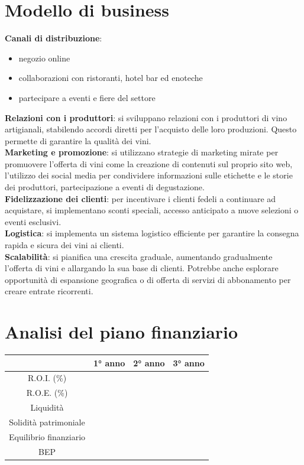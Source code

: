 \documentclass[12pt, a4paper]{article}
\newcommand{\meskip}{\medskip \\}
\begin{document}
\section*{Modello di business}
\textbf{Canali di distribuzione}:
\begin{itemize}[itemsep=-5pt, topsep=0pt]
    \item negozio online
    \item collaborazioni con ristoranti, hotel bar ed enoteche
    \item partecipare a eventi e fiere del settore
\end{itemize}\medskip
\textbf{Relazioni con i produttori}: si sviluppano relazioni con i produttori di vino artigianali, stabilendo accordi diretti per l'acquisto delle loro produzioni. Questo permette di garantire la qualità dei vini.\meskip
\textbf{Marketing e promozione}: si utilizzano strategie di marketing mirate per promuovere l'offerta di vini come la creazione di contenuti sul proprio sito web, l'utilizzo dei social media per condividere informazioni sulle etichette e le storie dei produttori, partecipazione a eventi di degustazione.\meskip
\textbf{Fidelizzazione dei clienti}: per incentivare i clienti fedeli a continuare ad acquistare, si implementano sconti speciali, accesso anticipato a nuove selezioni o eventi esclusivi.\meskip
\textbf{Logistica}: si implementa un sistema logistico efficiente per garantire la consegna rapida e sicura dei vini ai clienti.\meskip
\textbf{Scalabilità}: si pianifica una crescita graduale, aumentando gradualmente l'offerta di vini e allargando la sua base di clienti. Potrebbe anche esplorare opportunità di espansione geografica o di offerta di servizi di abbonamento per creare entrate ricorrenti.
\newpage
\section*{Analisi del piano finanziario}
\begin{tabular}{|c|c|c|c|}
    \hline
                           & 1° anno & 2° anno & 3° anno \\ \hline
    R.O.I. (\%)            &         &         &         \\ \hline
    R.O.E. (\%)            &         &         &         \\ \hline
    Liquidità              &         &         &         \\ \hline
    Solidità patrimoniale  &         &         &         \\ \hline
    Equilibrio finanziario &         &         &         \\ \hline
    BEP                    &         &         &         \\ \hline
\end{tabular}
\end{document}
